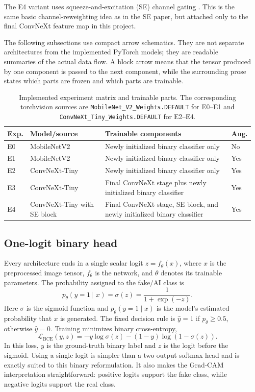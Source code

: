 \documentclass[11pt,a4paper]{article}
\begin{document}
The E4 variant uses squeeze-and-excitation (SE) channel gating
\cite{hu2018squeeze}. This is the same basic channel-reweighting idea as in
the SE paper, but attached only to the final ConvNeXt feature map in this
project.

The following subsections use compact arrow schematics. They are not separate
architectures from the implemented PyTorch models; they are readable summaries
of the actual data flow. A block arrow means that the tensor produced by one
component is passed to the next component, while the surrounding prose states
which parts are frozen and which parts are trainable.

\begin{table}[H]
\centering
\small
\begin{tabular}{@{}p{}p{}p{}p{}@{}}
\toprule
Exp. & Model/source & Trainable components & Aug. \\
\midrule
E0 & MobileNetV2 & Newly initialized binary classifier only & No \\
E1 & MobileNetV2 & Newly initialized binary classifier only & Yes \\
E2 & ConvNeXt-Tiny & Newly initialized binary classifier only & Yes \\
E3 & ConvNeXt-Tiny
   & Final ConvNeXt stage plus newly initialized binary classifier & Yes \\
E4 & ConvNeXt-Tiny with SE block
   & Final ConvNeXt stage, SE block, and newly initialized binary classifier & Yes \\
\bottomrule
\end{tabular}
\caption{Implemented experiment matrix and trainable parts. The corresponding
torchvision sources are \texttt{MobileNet\_V2\_Weights.DEFAULT} for E0--E1
and \texttt{ConvNeXt\_Tiny\_Weights.DEFAULT} for E2--E4.}
\label{tab:implemented-architectures}
\end{table}

\subsection{One-logit binary head}

Every architecture ends in a single scalar logit \(z=f_\theta(x)\), where
\(x\) is the preprocessed image tensor, \(f_\theta\) is the network, and
\(\theta\) denotes its trainable parameters. The probability assigned to the
fake/AI class is
\[
  p_\theta(y=1\mid x) = \sigma(z) = \frac{1}{1+\exp(-z)}.
\]
Here \(\sigma\) is the sigmoid function and \(p_\theta(y=1\mid x)\) is the
model's estimated probability that \(x\) is generated. The fixed decision rule
is \(\hat{y}=1\) if \(p_\theta\geq0.5\), otherwise \(\hat{y}=0\). Training
minimizes binary cross-entropy,
\[
  \mathcal{L}_{\mathrm{BCE}}(y,z)
  = -y\log\sigma(z) - (1-y)\log(1-\sigma(z)).
\]
In this loss, \(y\) is the ground-truth binary label and \(z\) is the logit
before the sigmoid. Using a single logit is simpler than a two-output softmax
head and is exactly suited to this binary reformulation. It also makes the
Grad-CAM interpretation straightforward: positive logits support the fake
class, while negative logits support the real class.
\end{document}
